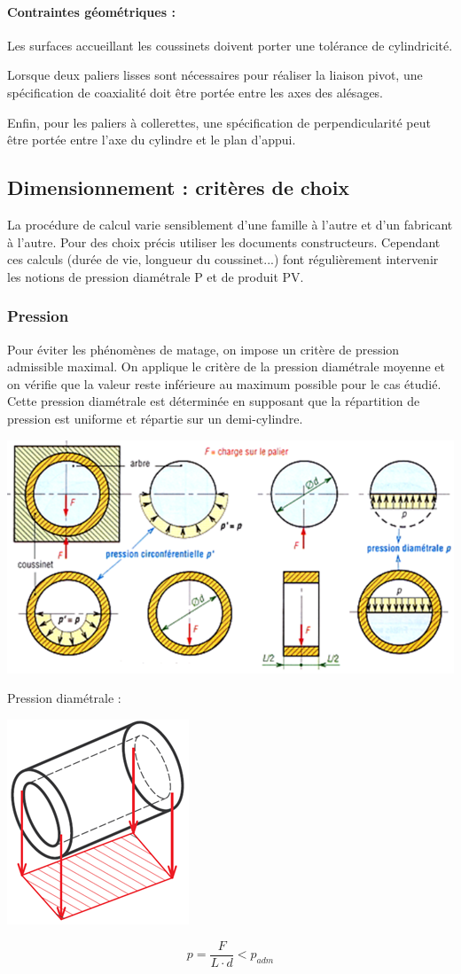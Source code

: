 \documentclass[11pt,oneside]{article}
\begin{document}
\paragraph*{Contraintes géométriques :}
Les surfaces accueillant les coussinets doivent porter une tolérance de cylindricité. 

Lorsque deux paliers lisses sont nécessaires pour réaliser la liaison pivot, une spécification de coaxialité doit être portée entre les axes des alésages. 

Enfin, pour les paliers à collerettes, une spécification de perpendicularité peut être portée
entre l'axe du  cylindre et le plan d'appui.

\subsection{Dimensionnement : critères de choix}
La procédure de calcul varie sensiblement d'une famille à l'autre et d'un fabricant à l'autre. Pour des choix précis utiliser les documents constructeurs. Cependant ces calculs (durée de vie, longueur du coussinet...) font régulièrement intervenir les notions de pression diamétrale P et de produit PV.

\subsubsection{Pression}
Pour éviter les phénomènes de matage, on impose un critère de pression admissible maximal.
On applique le critère de la pression diamétrale moyenne et on vérifie que la valeur reste inférieure au maximum possible pour le cas étudié.
Cette pression diamétrale est déterminée en supposant que la répartition de pression est uniforme et répartie sur un demi-cylindre. 


\begin{center}
\includegraphics[width=.75\textwidth]{png/fig20}
\end{center}

Pression diamétrale :
\begin{center}
\includegraphics[width=.3\textwidth]{png/fig21}
\end{center}
$$ 
p=\dfrac{F}{L\cdot d} < p_{adm}
$$
\end{document}
